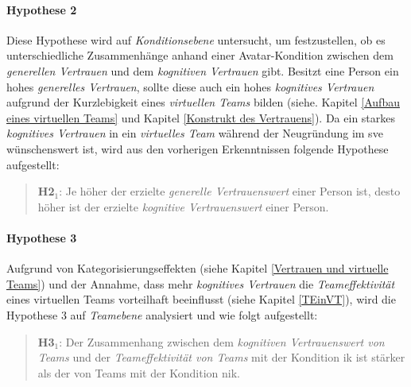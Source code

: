\documentclass[a4paper,11pt]{article}%
\renewcommand{\\}{\vspace*{0.5\baselineskip} \newline}
\begin{document}
\paragraph{Hypothese 2}
Diese Hypothese wird auf \textit{Konditionsebene} untersucht, um festzustellen, ob es unterschiedliche Zusammenhänge anhand einer Avatar-Kondition zwischen dem \textit{generellen Vertrauen} und dem \textit{kognitiven Vertrauen} gibt. Besitzt eine Person ein hohes \textit{generelles Vertrauen}, sollte diese auch ein hohes \textit{kognitives Vertrauen} aufgrund der Kurzlebigkeit eines \textit{virtuellen Teams} bilden (siehe. Kapitel \ref{Aufbau eines virtuellen Teams} und Kapitel \ref{Konstrukt des Vertrauens}).
Da ein starkes \textit{kognitives Vertrauen} in ein \textit{virtuelles Team} während der Neugründung im \ac{sve} wünschenswert ist, wird aus den vorherigen Erkenntnissen folgende Hypothese aufgestellt:
\begin{quote}
\textbf{H2$_{1}$}: Je höher der erzielte \textit{generelle Vertrauenswert} einer Person ist, desto höher ist der erzielte \textit{kognitive Vertrauenswert} einer Person.
\end{quote}

\paragraph{Hypothese 3}
Aufgrund von Kategorisierungseffekten (siehe Kapitel \ref{Vertrauen und virtuelle Teams}) und der Annahme, dass mehr \textit{kognitives Vertrauen} die \textit{Teameffektivität} eines virtuellen Teams vorteilhaft beeinflusst (siehe Kapitel \ref{TEinVT}), wird die Hypothese 3 auf \textit{Teamebene} analysiert und wie folgt aufgestellt: 
\begin{quote}
\textbf{H3$_{1}$}: Der Zusammenhang zwischen dem \textit{kognitiven Vertrauenswert von Teams} und der \textit{Teameffektivität von Teams} mit der Kondition \ac{ik} ist stärker als der von Teams mit der Kondition \ac{nik}.
\end{quote}
\end{document}
